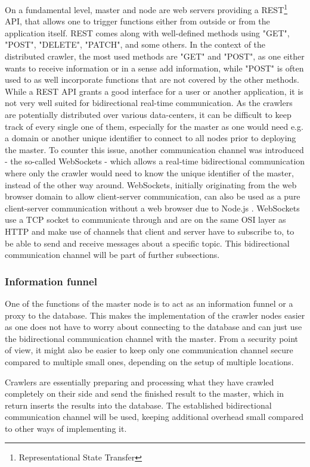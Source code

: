 On a fundamental level, master and node are web servers providing a REST\footnote{Representational State Transfer} API, that allows one to trigger functions either from outside or from the application itself. REST comes along with well-defined methods using "GET", "POST", "DELETE", "PATCH", and some others. In the context of the distributed crawler, the most used methods are "GET" and "POST", as one either wants to receive information or in a sense add information, while "POST" is often used to as well incorporate functions that are not covered by the other methods.
While a REST API grants a good interface for a user or another application, it is not very well suited for bidirectional real-time communication. As the crawlers are potentially distributed over various data-centers, it can be difficult to keep track of every single one of them, especially for the master as one would need e.g. a domain or another unique identifier to connect to all nodes prior to deploying the master. To counter this issue, another communication channel was introduced - the so-called WebSockets - which allows a real-time bidirectional communication where only the crawler would need to know the unique identifier of the master, instead of the other way around. WebSockets, initially originating from the web browser domain to allow client-server communication, can also be used as a pure client-server communication without a web browser due to Node.js . WebSockets use a TCP socket to communicate through and are on the same OSI layer as HTTP and make use of channels that client and server have to subscribe to, to be able to send and receive messages about a specific topic. This bidirectional communication channel will be part of further subsections.

\subsubsection{Information funnel}
One of the functions of the master node is to act as an information funnel or a proxy to the database. This makes the implementation of the crawler nodes easier as one does not have to worry about connecting to the database and can just use the bidirectional communication channel with the master. From a security point of view, it might also be easier to keep only one communication channel secure compared to multiple small ones, depending on the setup of multiple locations.

Crawlers are essentially preparing and processing what they have crawled completely on their side and send the finished result to the master, which in return inserts the results into the database. The established bidirectional communication channel will be used, keeping additional overhead small compared to other ways of implementing it.

